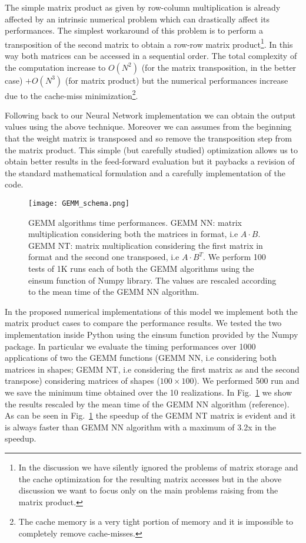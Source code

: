 \documentclass{standalone}
\begin{document}
The simple matrix product as given by row-column multiplication is already affected by an intrinsic numerical problem which can drastically affect its performances.
The simplest workaround of this problem is to perform a transposition of the second matrix to obtain a row-row matrix product\footnote{
  In the discussion we have silently ignored the problems of matrix storage and the cache optimization for the resulting matrix accesses but in the above discussion we want to focus only on the main problems raising from the matrix product.
}.
In this way both matrices can be accessed in a sequential order.
The total complexity of the computation increase to $O(N^2)$ (for the matrix transposition, in the better case) $+ O(N^3)$ (for matrix product) but the numerical performances increase due to the cache-miss minimization\footnote{
  The cache memory is a very tight portion of memory and it is impossible to completely remove cache-misses.
}.

Following back to our Neural Network implementation we can obtain the output values using the above technique.
Moreover we can assumes from the beginning that the weight matrix is transposed and so remove the transposition step from the matrix product.
This simple (but carefully studied) optimization allows us to obtain better results in the feed-forward evaluation but it paybacks a revision of the standard mathematical formulation and a carefully implementation of the code.

\begin{figure}[htbp]
\texttt{[image: GEMM\_schema.png]}
\quad
\centering
\def\svgwidth{0.45\textwidth}

\caption{GEMM algorithms time performances.
\textsf{GEMM NN}: matrix multiplication considering both the matrices in  format, i.e $A\cdot B$.
\textsf{GEMM NT}: matrix multiplication considering the first matrix in  format and the second one transposed, i.e $A\cdot B^T$.
We perform 100 tests of 1K runs each of both the \textsf{GEMM} algorithms using the \textsf{einsum} function of \textsf{Numpy} library.
The values are rescaled according to the mean time of the \textsf{GEMM NN} algorithm.
}
\label{fig:gemm}
\end{figure}

In the proposed numerical implementations of this model we implement both the matrix product cases to compare the performance results.
We tested the two implementation inside \textsf{Python} using the \textsf{einsum} function provided by the \textsf{Numpy} package.
In particular we evaluate the timing performances over 1000 applications of two the \textsf{GEMM} functions (\textsf{GEMM NN}, i.e considering both matrices in  shapes; \textsf{GEMM NT}, i.e considering the first matrix as  and the second transpose) considering matrices of shapes ($100\times100$).
We performed 500 run and we save the minimum time obtained over the 10 realizations.
In Fig.~\ref{fig:gemm} we show the results rescaled by the mean time of the \textsf{GEMM NN} algorithm (reference).
As can be seen in Fig.~\ref{fig:gemm} the speedup of the \textsf{GEMM NT} matrix is evident and it is always faster than GEMM NN algorithm with a maximum of 3.2x in the speedup.
\end{document}
